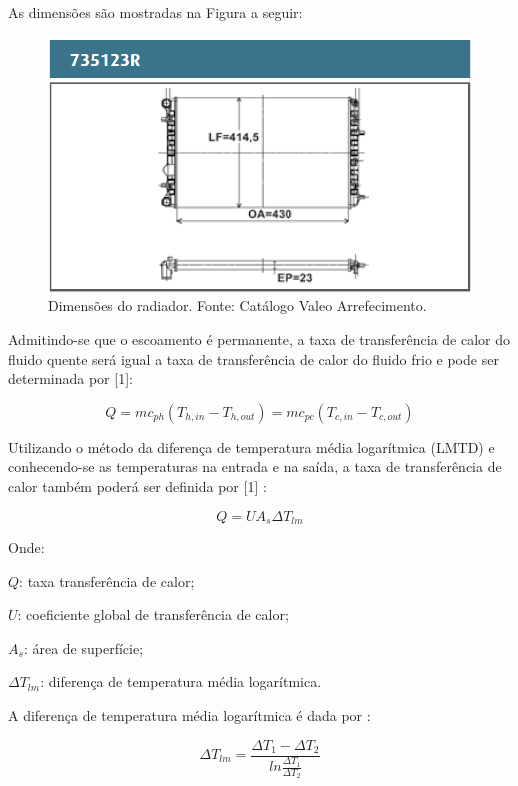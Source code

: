As dimensões são mostradas na Figura a seguir:

\begin{figure}[h!]
	\centering
	\includegraphics[keepaspectratio=true,scale= 0.5]{figuras/dimensoes-radiador.png}
	\caption{Dimensões do radiador. Fonte: Catálogo Valeo Arrefecimento.}
	\label{dimensoes-radiador}
\end{figure}

Admitindo-se que o escoamento é permanente, a taxa de transferência de calor do fluido quente será igual a taxa de transferência de calor do fluido frio e pode ser determinada por [1]:

\begin{equation}
	Q = mc_{ph}(T_{h, in} - T_{h, out}) = mc_{pc}(T_{c, in} - T_{c, out})
\end{equation}

Utilizando o método da diferença de temperatura média logarítmica (LMTD) e conhecendo-se as temperaturas na entrada e na saída, a taxa de transferência de calor também poderá ser definida por [1] :

\begin{equation}
	Q = UA_{s}\Delta T_{lm}
\end{equation}

Onde:

$Q$: taxa transferência de calor;

$U$: coeficiente global de transferência de calor;

$A_{s}$: área de superfície;

$\Delta T_{lm}$: diferença de temperatura média logarítmica.

A diferença de temperatura média logarítmica é dada por :

\begin{equation}
	\Delta T_{lm} = \frac{\Delta T_{1}-\Delta T_{2}}{ln \frac{\Delta T_{1}}{\Delta T_{2}}}
\end{equation}

